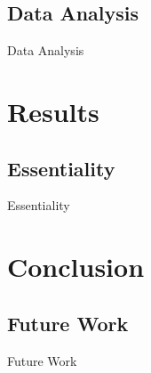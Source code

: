 \documentclass{slides}
\begin{document}
\subsection{Data Analysis}
\begin{Slide}{Data Analysis}
\end{Slide}

\section{Results}
\subsection{Essentiality}
\begin{Slide}{Essentiality}
\end{Slide}

\section{Conclusion}
\subsection{Future Work}
\begin{Slide}{Future Work}
\end{Slide}
\end{document}
